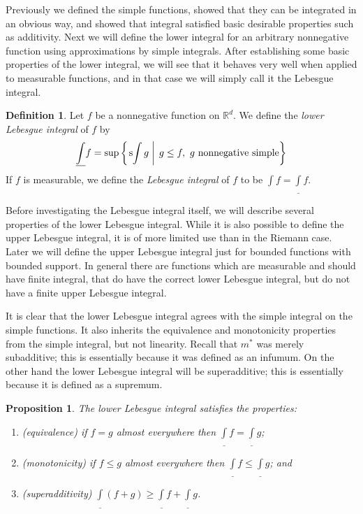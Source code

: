 \documentclass[10pt,oneside]{amsbook}
\newcommand{\RR}{{\mathbb R}}
\newcommand{\lint}{\underline\int}
\theoremstyle{definition}
\theoremstyle{plain}
\newtheorem{prop}[thm]{Proposition}
\theoremstyle{definition}
\newtheorem{defn}[thm]{Definition}
\theoremstyle{remark}
\numberwithin{equation}{section}
\numberwithin{figure}{section}
\begin{document}
Previously we defined the simple functions, showed that they can be integrated in an obvious way, and showed that integral satisfied basic desirable properties such as additivity. Next we will define the lower integral for an arbitrary nonnegative function using approximations by simple integrals. After establishing some basic properties of the lower integral, we will see that it behaves very well when applied to measurable functions, and in that case we will simply call it the Lebesgue integral.

\begin{defn}
  Let $f$ be a nonnegative function on $\RR^d$. We define the \emph{lower Lebesgue integral} of $f$ by
  \[\underline{\int}f=\sup\left\{\left.\text{s}\kern-2pt\int g\;\right|\; g\leq f,\text{ $g$ nonnegative simple}\right\}
  \]
  If $f$ is measurable, we define the \emph{Lebesgue integral} of $f$ to be $\int f=\lint f$.
\end{defn}

Before investigating the Lebesgue integral itself, we will describe several properties of the lower Lebesgue integral. While it is also possible to define the upper Lebesgue integral, it is of more limited use than in the Riemann case. Later we will define the upper Lebesgue integral just for bounded functions with bounded support. In general there are functions which are measurable and should have finite integral, that do have the correct lower Lebesgue integral, but do not have a finite upper Lebesgue integral.

It is clear that the lower Lebesgue integral agrees with the simple integral on the simple functions. It also inherits the equivalence and monotonicity properties from the simple integral, but not linearity. Recall that $m^*$ was merely subadditive; this is essentially because it was defined as an infumum. On the other hand the lower Lebesgue integral will be superadditive; this is essentially because it is defined as a supremum.

\begin{prop}
  The lower Lebesgue integral satisfies the properties:
  \begin{enumerate}
  \item (equivalence) if $f=g$ almost everywhere then $\lint f=\lint g$;
  \item (monotonicity) if $f\leq g$ almost everywhere then $\lint f\leq\lint g$; and
  \item (superadditivity) $\lint(f+g)\geq\lint f+\lint g$.
  \end{enumerate}
\end{prop}
\end{document}
